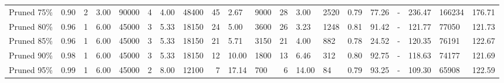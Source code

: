 \begin{table*}
{\begin{tabular}{llrllrllrllrllrlllll}
 Pruned 75\% &     0.90 &               2 &       3.00 &   90000 &                 4 &       4.00 &   48400 &                45 &       2.67 &    9000 &           28 &       3.00 &    2520 & 0.79 & 77.26 &      - &  236.47 &  166234 &    176.71 \\
 Pruned 80\% &     0.96 &               1 &       6.00 &   45000 &                 3 &       5.33 &   18150 &                24 &       5.00 &    3600 &           26 &       3.23 &    1248 & 0.81 & 91.42 &      - &  121.77 &   77050 &    121.73 \\
 Pruned 85\% &     0.96 &               1 &       6.00 &   45000 &                 3 &       5.33 &   18150 &                21 &       5.71 &    3150 &           21 &       4.00 &     882 & 0.78 & 24.52 &      - &  120.35 &   76191 &    122.67 \\
 Pruned 90\% &     0.98 &               1 &       6.00 &   45000 &                 3 &       5.33 &   18150 &                12 &      10.00 &    1800 &           13 &       6.46 &     312 & 0.80 & 92.75 &      - &  118.63 &   74177 &    121.69 \\
 Pruned 95\% &     0.99 &               1 &       6.00 &   45000 &                 2 &       8.00 &   12100 &                 7 &      17.14 &     700 &            6 &      14.00 &      84 & 0.79 & 93.25 &      - &  109.30 &   65908 &    122.59 \\
\bottomrule
\end{tabular}}
\end{table*}




